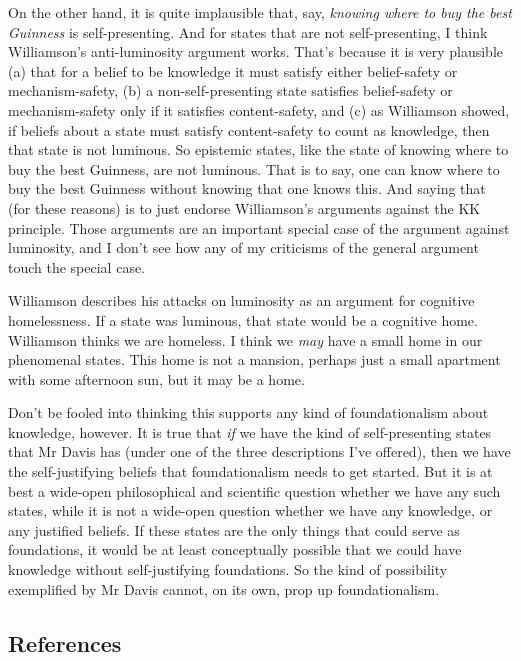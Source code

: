 \documentclass[
  10pt,
  letterpaper,
  DIV=11,
  numbers=noendperiod,
  twoside]{scrartcl}
\begin{document}
On the other hand, it is quite implausible that, say, \emph{knowing
where to buy the best Guinness} is self-presenting. And for states that
are not self-presenting, I think Williamson's anti-luminosity argument
works. That's because it is very plausible (a) that for a belief to be
knowledge it must satisfy either belief-safety or mechanism-safety, (b)
a non-self-presenting state satisfies belief-safety or mechanism-safety
only if it satisfies content-safety, and (c) as Williamson showed, if
beliefs about a state must satisfy content-safety to count as knowledge,
then that state is not luminous. So epistemic states, like the state of
knowing where to buy the best Guinness, are not luminous. That is to
say, one can know where to buy the best Guinness without knowing that
one knows this. And saying that (for these reasons) is to just endorse
Williamson's arguments against the KK principle. Those arguments are an
important special case of the argument against luminosity, and I don't
see how any of my criticisms of the general argument touch the special
case.

Williamson describes his attacks on luminosity as an argument for
cognitive homelessness. If a state was luminous, that state would be a
cognitive home. Williamson thinks we are homeless. I think we \emph{may}
have a small home in our phenomenal states. This home is not a mansion,
perhaps just a small apartment with some afternoon sun, but it may be a
home.

Don't be fooled into thinking this supports any kind of foundationalism
about knowledge, however. It is true that \emph{if} we have the kind of
self-presenting states that Mr Davis has (under one of the three
descriptions I've offered), then we have the self-justifying beliefs
that foundationalism needs to get started. But it is at best a wide-open
philosophical and scientific question whether we have any such states,
while it is not a wide-open question whether we have any knowledge, or
any justified beliefs. If these states are the only things that could
serve as foundations, it would be at least conceptually possible that we
could have knowledge without self-justifying foundations. So the kind of
possibility exemplified by Mr Davis cannot, on its own, prop up
foundationalism.

\subsection*{References}\label{references}
\end{document}
